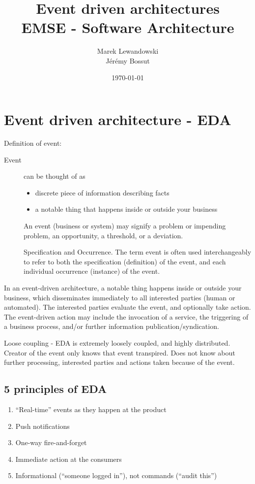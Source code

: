 \documentclass[12pt, a4paper]{article}
\author{Marek Lewandowski \\ Jérémy Bossut}
\date{\today}
\title{Event driven architectures \\ \vspace{2 mm} {\large EMSE - Software Architecture}}
\begin{document}
\maketitle



\newpage

\section{Event driven architecture - EDA}
Definition of event:

\begin{description}
\item[Event] can be thought of as
\begin{itemize}
 \item discrete piece of information describing facts
 \item a notable thing that happens inside or outside your business
 \end{itemize}

 An event (business or system) may signify a problem or impending problem, an opportunity, a threshold, or a deviation.

 Specification and Occurrence. The term event is often used interchangeably to refer to both the specification (definition) of the event, and each individual occurrence (instance) of the event.

\end{description}

In an event-driven architecture, a notable thing happens inside or outside your business, which disseminates immediately to all interested parties (human or automated). The interested parties evaluate the event, and optionally take action. The event-driven action may include the invocation of a service, the triggering of a business process, and/or further information publication/syndication.

Loose coupling - EDA is extremely loosely coupled, and highly distributed. Creator of the event only knows that event transpired. Does not know about further processing, interested parties and actions taken because of the event.

\subsection{5 principles of EDA}
\begin{enumerate}
\item ``Real-time'' events as they happen at the product
\item Push notifications
\item One-way fire-and-forget
\item Immediate action at the consumers 
\item Informational (``someone logged in''), not commands (``audit this'') 
\end{enumerate}
\end{document}

